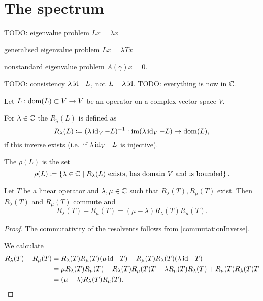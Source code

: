 \section{The spectrum}
TODO: eigenvalue problem $Lx = \lambda x$

generalised eigenvalue problem $Lx = \lambda T x$

nonstandard eigenvalue problem $A(\gamma)x = 0$.

TODO: consistency $\lambda \operatorname{id} - L$, not $L-\lambda \operatorname{id}$.
TODO: everything is now in $\mathbb{C}$.

\begin{definition}
Let $L: \operatorname{dom}(L)\subset V \to V$ be an operator on a complex vector space $V$.

For $\lambda\in\mathbb{C}$ the  $R_\lambda(L)$ is defined as
\[ R_\lambda(L) \coloneqq (\lambda \operatorname{id}_V - L)^{-1}: \operatorname{im}(\lambda \operatorname{id}_V - L)\to\operatorname{dom}(L), \]
if this inverse exists (i.e.\ if $\lambda \operatorname{id}_V - L$ is injective).

The  $\rho(L)$ is the set
\[ \rho(L) \coloneqq \left\{ \lambda\in \mathbb{C} \;\middle|\; \text{$R_\lambda(L)$ exists, has domain $V$ and is bounded} \right\}. \]
\end{definition}

\begin{lemma}
Let $T$ be a linear operator and $\lambda,\mu\in\mathbb{C}$ such that $R_\lambda(T), R_\mu(T)$ exist. Then $R_\lambda(T)$ and $R_\mu(T)$ commute and
\[ R_\lambda(T) - R_\mu(T) = (\mu-\lambda)R_\lambda(T)R_\mu(T). \]
\end{lemma}
\begin{proof}
The commutativity of the resolvents follows from \ref{commutationInverse}.

We calculate
\begin{align*}
R_\lambda(T) - R_\mu(T) &= R_\lambda(T)R_\mu(T)(\mu\operatorname{id} - T) - R_\mu(T)R_\lambda(T)(\lambda\operatorname{id} - T) \\
&= \mu R_\lambda(T)R_\mu(T) - R_\lambda(T)R_\mu(T) T - \lambda R_\mu(T)R_\lambda(T) + R_\mu(T)R_\lambda(T) T \\
&= (\mu - \lambda)R_\lambda(T)R_\mu(T).
\end{align*}
\end{proof}

